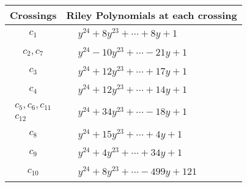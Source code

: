 \documentclass[1p]{elsarticle_modified}
\theoremstyle{definition}
\begin{document}
\begin{tabular}{m{50pt}|m{274pt}}
Crossings & \hspace{64pt}Riley Polynomials at each crossing \\
\hline $$\begin{aligned}c_{1}\end{aligned}$$&$\begin{aligned}
&y^{24}+8 y^{23}+\cdots+8 y+1
\end{aligned}$\\
\hline $$\begin{aligned}c_{2},c_{7}\end{aligned}$$&$\begin{aligned}
&y^{24}-10 y^{23}+\cdots-21 y+1
\end{aligned}$\\
\hline $$\begin{aligned}c_{3}\end{aligned}$$&$\begin{aligned}
&y^{24}+12 y^{23}+\cdots+17 y+1
\end{aligned}$\\
\hline $$\begin{aligned}c_{4}\end{aligned}$$&$\begin{aligned}
&y^{24}+12 y^{23}+\cdots+14 y+1
\end{aligned}$\\
\hline $$\begin{aligned}c_{5},c_{6},c_{11}\\c_{12}\end{aligned}$$&$\begin{aligned}
&y^{24}+34 y^{23}+\cdots-18 y+1
\end{aligned}$\\
\hline $$\begin{aligned}c_{8}\end{aligned}$$&$\begin{aligned}
&y^{24}+15 y^{23}+\cdots+4 y+1
\end{aligned}$\\
\hline $$\begin{aligned}c_{9}\end{aligned}$$&$\begin{aligned}
&y^{24}+4 y^{23}+\cdots+34 y+1
\end{aligned}$\\
\hline $$\begin{aligned}c_{10}\end{aligned}$$&$\begin{aligned}
&y^{24}+8 y^{23}+\cdots-499 y+121
\end{aligned}$\\
\hline
\end{tabular}\\~\\
\end{document}
